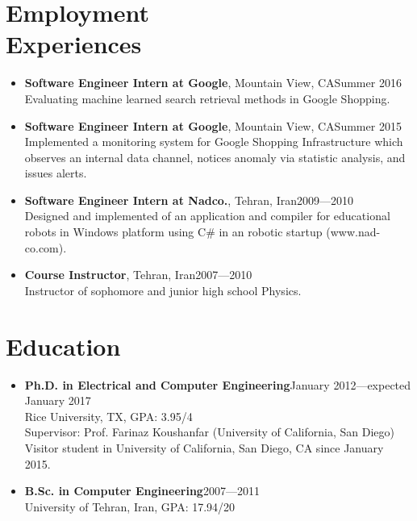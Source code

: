 \documentclass[overlapped]{res}
\begin{document}

\address{
 (832)-538-8848\\
 \href{mailto:ebrahim@rice.edu}{ebrahim(at)rice.edu}\\
 \href{mailto:e.songhori@gmail.com }{e.songhori(at)gmail.com}\\
 \href{https://esonghori.github.io}{esonghori.github.io}
}

\begin{resume}

\section{Employment\\ Experiences}
\begin{itemize}
\item {\bf Software Engineer Intern at Google}, Mountain View, CA\hfill Summer 2016\\
Evaluating machine learned search retrieval methods in Google Shopping.
\item {\bf Software Engineer Intern at Google}, Mountain View, CA\hfill Summer 2015\\
Implemented a monitoring system for Google Shopping Infrastructure which observes an internal data channel, notices anomaly via statistic analysis, and issues alerts.
\item {\bf Software Engineer Intern at Nadco.}, Tehran, Iran\hfill 2009---2010\\
Designed and implemented of an application and compiler for educational robots in Windows platform using C\# in an robotic startup (www.nad-co.com).
\item {\bf Course Instructor}, Tehran, Iran\hfill 2007---2010 \\
Instructor of sophomore and junior high school Physics.
\end{itemize}

\section{Education}
\begin{itemize}
\item {\bf Ph.D. in Electrical and Computer Engineering}\hfill January 2012---expected January 2017\\
Rice University, TX, GPA: 3.95/4\\
Supervisor: Prof. Farinaz Koushanfar (University of California, San Diego)\\
Visitor student in University of California, San Diego, CA since January 2015.\\
\item {\bf B.Sc. in Computer Engineering}\hfill 2007---2011\\
University of Tehran, Iran, GPA: 17.94/20\\
\end{itemize}



\end{resume}
\end{document}
